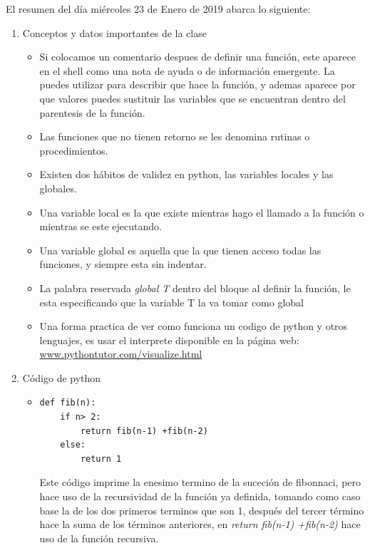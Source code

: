 \documentclass[letterpaper, 12pt,oneside]{article}
\begin{document}
	El resumen del día miércoles 23 de Enero de 2019 abarca lo siguiente:
	\begin{enumerate}
		\item Conceptos y datos importantes de la clase
			\begin{itemize}
				\item Si colocamos un comentario despues de definir una función, este aparece en el shell como una nota de ayuda o de información emergente. La puedes utilizar para describir que hace la función, y ademas aparece por que valores puedes sustituir las variables que se encuentran dentro del parentesis de la función.
				\item Las funciones que no tienen retorno se les denomina rutinas o procedimientos.
				\item Existen dos hábitos de validez en python, las variables locales y las globales.
				\item Una variable local es la que existe mientras hago el llamado a la función o mientras se este ejecutando.
				\item Una variable global es aquella que la que tienen acceso todas las funciones, y siempre esta sin indentar.
				\item La palabra reservada \textit{global T} dentro del bloque al definir la función, le esta especificando que la variable T la va tomar como global
				\item Una forma practica de ver como funciona un codigo de python y otros lenguajes, es usar el interprete disponible en la página web: \url{www.pythontutor.com/visualize.html}
				
			\end{itemize}
		
		
		
		\item Código de python
			\begin{itemize}
				\item \begin{lstlisting}
def fib(n):
    if n> 2:
        return fib(n-1) +fib(n-2)
    else:
        return 1
				\end{lstlisting} Este código imprime la enesimo termino de la suceción de fibonnaci, pero hace uso de la recursividad de la función ya definida, tomando como caso base la de los dos primeros terminos que son 1, después del tercer término hace la suma de los términos anteriores, en \textit{return fib(n-1) +fib(n-2)} hace uso de la función recursiva.\\
				

\end{itemize}
\end{enumerate}
\end{document}
